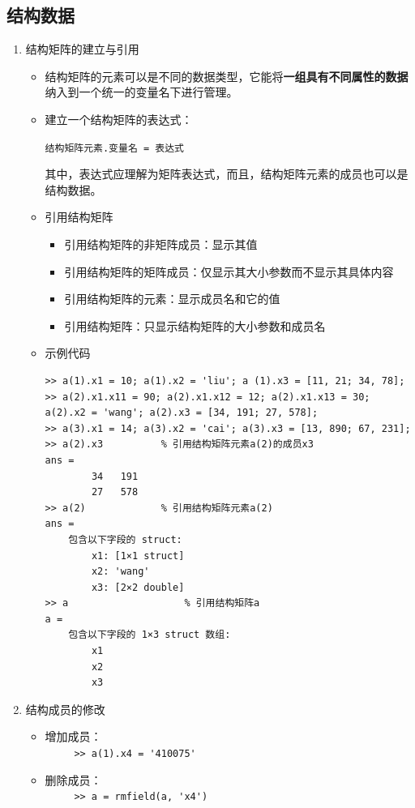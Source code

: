 \subsection{结构数据}
\begin{enumerate}
	\item 结构矩阵的建立与引用
	\begin{itemize}
		\item 结构矩阵的元素可以是不同的数据类型，它能将\textbf{一组具有不同属性的数据}纳入到一个统一的变量名下进行管理。
		\item 建立一个结构矩阵的表达式：
		\begin{center}
			\lstinline|结构矩阵元素.变量名 = 表达式|
		\end{center}
	其中，表达式应理解为矩阵表达式，而且，结构矩阵元素的成员也可以是结构数据。
	\item 引用结构矩阵
	\begin{itemize}
		\item 引用结构矩阵的非矩阵成员：显示其值
		\item 引用结构矩阵的矩阵成员：仅显示其大小参数而不显示其具体内容
		\item 引用结构矩阵的元素：显示成员名和它的值
		\item 引用结构矩阵：只显示结构矩阵的大小参数和成员名
	\end{itemize}
	\item 示例代码
	\begin{lstlisting}
>> a(1).x1 = 10; a(1).x2 = 'liu'; a (1).x3 = [11, 21; 34, 78];
>> a(2).x1.x11 = 90; a(2).x1.x12 = 12; a(2).x1.x13 = 30; a(2).x2 = 'wang'; a(2).x3 = [34, 191; 27, 578];
>> a(3).x1 = 14; a(3).x2 = 'cai'; a(3).x3 = [13, 890; 67, 231];
>> a(2).x3			% 引用结构矩阵元素a(2)的成员x3
ans = 
    	34   191
		27   578
>> a(2)				% 引用结构矩阵元素a(2)
ans = 
	包含以下字段的 struct:
		x1: [1×1 struct]
		x2: 'wang'
		x3: [2×2 double]
>> a					% 引用结构矩阵a
a =
	包含以下字段的 1×3 struct 数组:
		x1
		x2
		x3
	\end{lstlisting}
	\end{itemize}
\item 结构成员的修改
\begin{itemize}
	\item 增加成员：\\
	\lstinline|		>> a(1).x4 = '410075'|
	\item 删除成员：\\
	\lstinline|		>> a = rmfield(a, 'x4')|
\end{itemize}
\end{enumerate}



